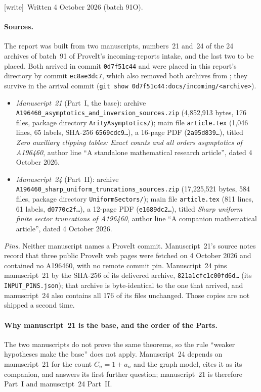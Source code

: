 \documentclass[11pt]{article}
\theoremstyle{definition}
\theoremstyle{remark}
\newcommand{\wtag}{\textup{[write]}}
\begin{document}
\wtag\ Written 4 October 2026 (batch 91O).

\paragraph{Sources.} The report was built from two manuscripts, numbers~21
and~24 of the 24 archives of batch~91 of ProveIt's incoming-reports
intake, and the last two to be placed.
Both arrived in commit \texttt{0d7f51c44} and were placed in this report's
directory by commit \texttt{ec8ae3dc7}, which also removed both archives
from ; they survive in the arrival commit
(\texttt{git show 0d7f51c44:docs/incoming/<archive>}).
\begin{itemize}
\item \emph{Manuscript~21} (Part~I, the base): archive
\nolinkurl{A196460_asymptotics_and_inversion_sources.zip} (4,852,913 bytes,
176 files, package directory \nolinkurl{ArityAsymptotics/}); main file
\texttt{article.tex} (1,046 lines, 65 labels, SHA-256
\texttt{6569cdc9\ldots}), a 16-page PDF (\texttt{2a95d839\ldots}), titled
\emph{Zero auxiliary clipping tables: Exact counts and all orders
asymptotics of A196460}, author line ``A standalone mathematical research
article'', dated 4 October 2026.
\item \emph{Manuscript~24} (Part~II): archive
\nolinkurl{A196460_sharp_uniform_truncations_sources.zip} (17,225,521 bytes,
584 files, package directory \nolinkurl{UniformSectors/}); main file
\texttt{article.tex} (811 lines, 61 labels, \texttt{d0770c2f\ldots}), a
12-page PDF (\texttt{e1689dc2\ldots}), titled \emph{Sharp uniform finite
sector truncations of A196460}, author line ``A companion mathematical
article'', dated 4 October 2026.
\end{itemize}
\emph{Pins.} Neither manuscript names a ProveIt commit. Manuscript~21's
source notes record that three public ProveIt web pages were fetched on
4 October 2026 and contained no A196460, with no remote commit pin.
Manuscript~24 pins manuscript~21 by the SHA-256 of its delivered archive,
\texttt{821a1cfc1c00fd6d\ldots} (its \texttt{INPUT\_PINS.json}); that
archive is byte-identical to the one that arrived, and manuscript~24 also
contains all 176 of its files unchanged. Those copies are not shipped a
second time.

\paragraph{Why manuscript~21 is the base, and the order of the Parts.} The
two manuscripts do not prove the same theorems, so the rule ``weaker
hypotheses make the base'' does not apply. Manuscript~24 depends on
manuscript~21 for the count $C_n=1+a_n$ and the graph model, cites it as
its companion, and answers its first further question; manuscript~21 is
therefore Part~I and manuscript~24 Part~II.
\end{document}
